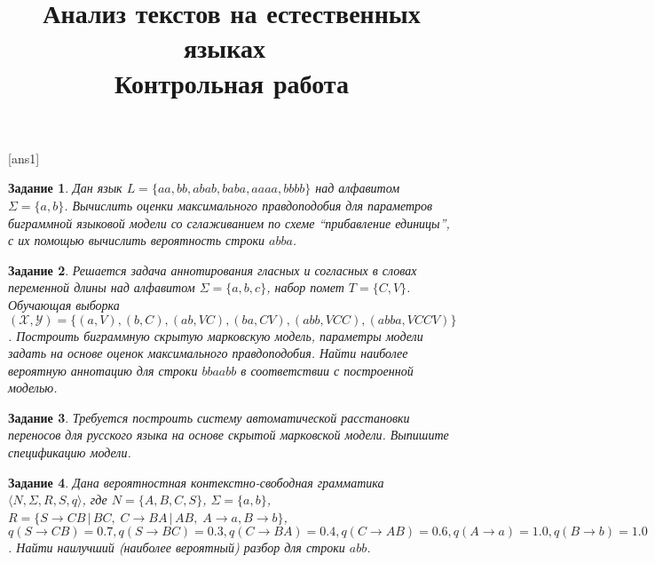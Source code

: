 \documentclass[10pt]{article}
\theoremstyle{example-style}
\newtheorem{example}{Задание}
\begin{document}
 

\title{Анализ текстов на естественных языках\ \\{\large Контрольная работа}}
\author{}
\date{}

\maketitle

[ans1]


\begin{example}
Дан язык $L = \{aa, bb, abab, baba, aaaa, bbbb\}$ над алфавитом $\Sigma = \{a, b\}$. Вычислить оценки максимального правдоподобия для параметров биграммной языковой модели со сглаживанием по схеме ``прибавление единицы'', с их помощью вычислить вероятность строки $abba$.
\end{example}

\begin{example}
Решается задача аннотирования гласных и согласных в словах переменной длины над алфавитом $\Sigma = \{a, b, c\}$, набор помет $T = \{C, V\}$.
Обучающая выборка $(\mathcal{X}, \mathcal{Y}) = \{(a, V), (b, C), (ab, VC), (ba, CV), (abb, VCC), (abba, VCCV) \}$. Построить биграммную скрытую марковскую модель, параметры модели задать на основе оценок максимального правдоподобия. Найти наиболее вероятную аннотацию для строки $bbaabb$ в соответствии с построенной моделью.
\end{example}

\begin{example}
Требуется построить систему автоматической расстановки переносов для русского языка на основе скрытой марковской модели. Выпишите спецификацию модели.
\end{example}

\begin{example}
Дана вероятностная контекстно-свободная грамматика $\langle N, \Sigma, R, S, q \rangle$, где $N = \{ A, B, C, S \}$, $\Sigma = \{a, b\}$,
$R = \{ S \to CB \, | \, BC, \; C \to BA \, | \, AB, \; A \to a, B \to b \}$, 
$q(S \to CB) = 0.7, q(S \to BC) = 0.3, q(C \to BA) = 0.4, q(C \to AB) = 0.6, q(A \to a) = 1.0, q(B \to b) = 1.0$.
Найти наилучший (наиболее вероятный) разбор для строки $abb$.
\end{example}

\end{document}

